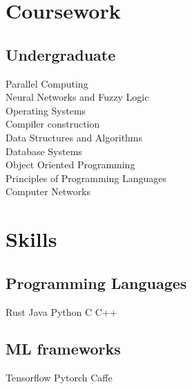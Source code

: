 \documentclass[]{smresume}
\begin{document}
\begin{minipage}[t]{0.33\textwidth}

\section{Coursework}

\subsection{Undergraduate}
Parallel Computing \\
Neural Networks and Fuzzy Logic \\
Operating Systems \\
Compiler construction \\
Data Structures and Algorithms \\
Database Systems \\
Object Oriented Programming \\
Principles of Programming Languages \\
Computer Networks \\
\sectionsep


\section{Skills}
\subsection{Programming Languages}
Rust \textbullet{} Java \textbullet{} Python \textbullet{} 
C \textbullet{} C++ 
\subsectionsep

\subsection{ML frameworks}
Tensorflow \textbullet{} Pytorch \textbullet{} Caffe
\subsectionsep


\end{minipage}
\end{document}

